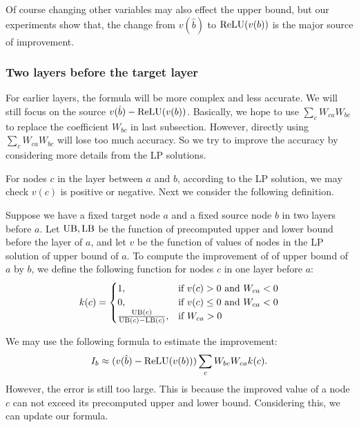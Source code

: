 Of course changing other variables may also effect the upper bound, but our experiments show that, the change from $v(\hat{b})$ to $\mathrm{ReLU}(v(b))$ is the major source of improvement. 




\subsubsection*{Two layers before the target layer}

For earlier layers, the formula will be more complex and less accurate. We will still focus on the source $v(\hat{b})-\mathrm{ReLU}(v(b))$. Basically, we hope to use $\sum_c W_{ca}W_{bc}$ to replace the coefficient $W_{bc}$ in last subsection. However, directly using $\sum_c W_{ca}W_{bc}$ will lose too much accuracy. So we try to improve the accuracy by considering more details from the LP solutions.

For nodes $c$ in the layer between $a$ and $b$, according to the LP solution, we may check $v(c)$ is positive or negative. Next we consider the following definition. 

\begin{definition} \label{2layer}
	Suppose we have a fixed target node $a$ and a fixed source node $b$ in two layers before $a$. Let $\mathrm{UB},\mathrm{LB}$ be the function of precomputed upper and lower bound before the layer of $a$, and let $v$ be the function of values of nodes in the LP solution of upper bound of $a$. 
	To compute the improvement of of upper bound of $a$ by $b$, we define the following function for nodes $c$ in one layer before $a$:
	\begin{align}
		k(c) =
		\begin{cases}
			1, & \text{if } v(c) > 0 \text{ and } W_{ca} < 0\\
			0, & \text{if } v(c) \leq 0 \text{ and } W_{ca} < 0\\
			\frac{\mathrm{UB}(c)}{\mathrm{UB}(c)-\mathrm{LB}(c)}, & \text{if }W_{ca} > 0
		\end{cases}
	\end{align} 
\end{definition} 

We may use the following formula to estimate the improvement:  \begin{align*}
	I_b \approx (v(\hat{b})-\mathrm{ReLU}(v(b)))\sum_c W_{bc}W_{ca}k(c).
\end{align*}However, the error is still too large. This is because the improved value of a node $c$ can not exceed its precomputed upper and lower bound. Considering this, we can update our formula.

